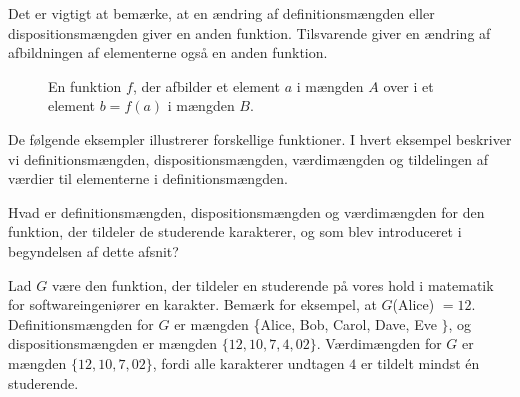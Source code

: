Det er vigtigt at bemærke, at en ændring af definitionsmængden eller dispositionsmængden giver en anden funktion. Tilsvarende giver en ændring af afbildningen af elementerne også en anden funktion.


\begin{figure}[htbp]
\centering
{}
\caption{En funktion \(f\), der afbilder et element \(a\) i mængden \(A\) over i et element \(b=f(a)\) i mængden \(B\).}
\label{fig:function_mapping}
\end{figure}

De følgende eksempler illustrerer forskellige funktioner. I hvert eksempel beskriver vi definitionsmængden, dispositionsmængden, værdimængden og tildelingen af værdier til elementerne i definitionsmængden.

\begin{example} Hvad er definitionsmængden, dispositionsmængden og værdimængden for den funktion, der tildeler de studerende karakterer, og som blev introduceret i begyndelsen af dette afsnit?

\begin{solution}
    Lad $G$ være den funktion, der tildeler en studerende på vores hold i matematik for softwareingeniører en karakter. Bemærk for eksempel, at $G$(Alice) $=12$. Definitionsmængden for $G$ er mængden \{Alice, Bob, Carol, Dave, Eve $\}$, og dispositionsmængden er mængden $\{12, 10, 7, 4, 02\}$. Værdimængden for $G$ er mængden $\{12, 10, 7, 02\}$, fordi alle karakterer undtagen $4$ er tildelt mindst én studerende.
\end{solution}
    
\end{example}

